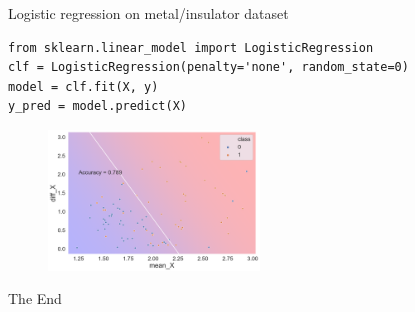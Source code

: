 \documentclass[aspectratio=169]{beamer}
\begin{document}
\begin{frame}[fragile]{Logistic regression on metal/insulator dataset}
\begin{verbatim}
from sklearn.linear_model import LogisticRegression
clf = LogisticRegression(penalty='none', random_state=0)
model = clf.fit(X, y)
y_pred = model.predict(X)
\end{verbatim}
\begin{figure}
    \centering
    \includegraphics[width=0.5\textwidth]{figures/logistic_metal_insulator.png}
\end{figure}
\end{frame} 

\begin{frame}
    \Huge{\centerline{The End}}
\end{frame}
\end{document}
